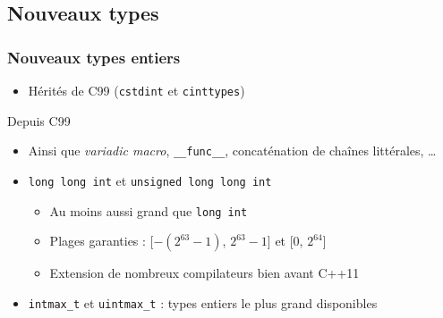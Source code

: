 \documentclass[C++.tex]{subfiles}
\begin{document}
\subsection*{Nouveaux types}
\begin{frame}[fragile]
	\frametitle{Nouveaux types entiers}
	\begin{itemize}
		\item Hérités de C99 (\lstinline[keywordstyle=\color{black}]|cstdint| et \lstinline|cinttypes|)
	\end{itemize}

	\begin{block}{Depuis C99}
	\begin{itemize}
		\item 	Ainsi que \textit{variadic macro}, \lstinline|__func__|, concaténation de chaînes littérales, \ldots
	\end{itemize}
	\end{block}

	\begin{itemize}
		\item \lstinline|long long int| et \lstinline|unsigned long long int|
		\begin{itemize}
			\item Au moins aussi grand que \lstinline|long int|
			\item Plages garanties : [$-(2^{63}-1)$, $2^{63}-1$] et [$0$, $2^{64}$]
			\item Extension de nombreux compilateurs bien avant C++11
		\end{itemize}
		\item \lstinline|intmax_t| et \lstinline|uintmax_t| : types entiers le plus grand disponibles
	\end{itemize}
\end{frame}
\end{document}
